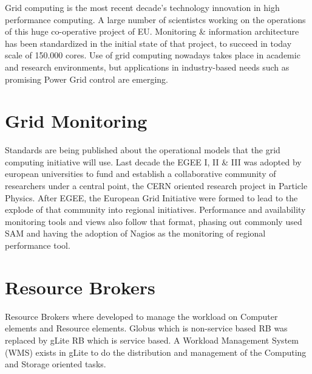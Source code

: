 
Grid computing \cite{li2005grid} is the most recent decade's technology
innovation in high performance computing. A large number of scientistcs working
on the operations of this huge co-operative project of EU. Monitoring \&
information architecture \cite{fisher2002datagrid} has been standardized in the
initial state of that project, to succeed in today scale of 150.000 cores. Use
of grid computing nowadays takes place in academic and research environments,
but applications in industry-based needs such as promising Power Grid control
\cite{Taylor2006} are emerging.

\section{Grid Monitoring}
Standards are being published about the operational models that the grid
computing initiative will use. Last decade the EGEE I, II \& III was adopted by
european universities to fund and establish a collaborative community of
researchers under a central point, the CERN oriented research project in
Particle Physics. After EGEE, the European Grid Initiative were formed to lead
to the explode of that community into regional initiatives. Performance
and availability monitoring tools and views also follow that format, phasing out
commonly used SAM \cite{egee3dsa122} and having the adoption of Nagios as the
monitoring of regional performance tool.

\section{Resource Brokers}
Resource Brokers \cite{Kertesz06ataxonomy} where developed to manage the
workload on Computer elements and Resource elements. Globus which is 
non-service based RB was replaced by gLite RB which is service based. A Workload
Management System (WMS) exists in gLite to do the distribution and management of
the Computing and Storage oriented tasks.

